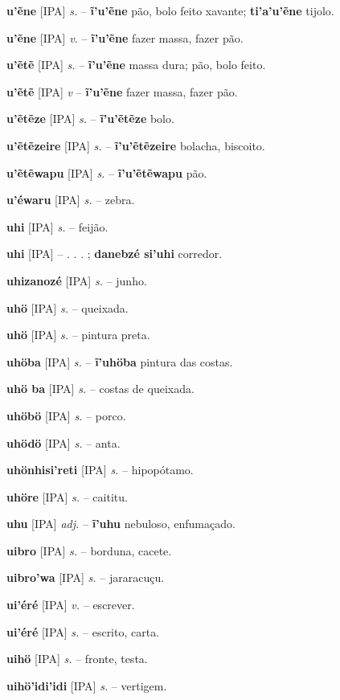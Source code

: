 \textbf{u'ẽne} [IPA] \textit{s.} -- \textbf{ĩ'u'ẽne} pão, bolo feito xavante; \textbf{ti'a'u'ẽne} tijolo.

\textbf{u'ẽne} [IPA] \textit{v.} -- \textbf{ĩ'u'ẽne} fazer massa, fazer pão.

\textbf{u'ẽtẽ} [IPA] \textit{s.} -- \textbf{ĩ'u'ẽne} massa dura; pão, bolo feito.

\textbf{u'ẽtẽ} [IPA] \textit{v} -- \textbf{ĩ'u'ẽne} fazer massa, fazer pão.

\textbf{u'ẽtẽze} [IPA] \textit{s.} -- \textbf{ĩ'u'ẽtẽze} bolo.

\textbf{u'ẽtẽzeire} [IPA] \textit{s.} -- \textbf{ĩ'u'ẽtẽzeire} bolacha, biscoito.

\textbf{u'ẽtẽwapu} [IPA] \textit{s.} -- \textbf{ĩ'u'ẽtẽwapu} pão.

\textbf{u'éwaru} [IPA] \textit{s.} -- zebra.

\textbf{uhi} [IPA] \textit{s.} -- feijão.

\textbf{uhi} [IPA] \textit{} -- . . . ; \textbf{danebzé si'uhi} corredor.

\textbf{uhizanozé} [IPA] \textit{s.} -- junho.

\textbf{uhö} [IPA] \textit{s.} -- queixada.

\textbf{uhö} [IPA] \textit{s.} -- pintura preta.

\textbf{uhöba} [IPA] \textit{s.} -- \textbf{ĩ'uhöba} pintura das costas.

\textbf{uhö ba} [IPA] \textit{s.} -- costas de queixada.

\textbf{uhöbö} [IPA] \textit{s.} -- porco.

\textbf{uhödö} [IPA] \textit{s.} -- anta.

\textbf{uhönhisi'reti} [IPA] \textit{s.} -- hipopótamo.

\textbf{uhöre} [IPA] \textit{s.} -- caititu.

\textbf{uhu} [IPA] \textit{adj.} -- \textbf{ĩ'uhu} nebuloso, enfumaçado.

\textbf{uibro} [IPA] \textit{s.} -- borduna, cacete.

\textbf{uibro'wa} [IPA] \textit{s.} -- jararacuçu.

\textbf{ui'éré} [IPA] \textit{v.} -- escrever.

\textbf{ui'éré} [IPA] \textit{s.} -- escrito, carta.

\textbf{uihö} [IPA] \textit{s.} -- fronte, testa.

\textbf{uihö'idi'idi} [IPA] \textit{s.} -- vertigem.

